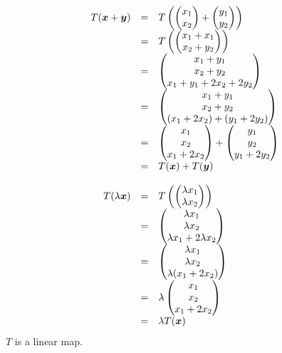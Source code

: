 \documentclass[11pt,a4paper]{article}
\begin{document}
\[\begin{array}{rcl}
  T(\boldsymbol{x} + \boldsymbol{y}) &=& T\left(\begin{pmatrix} x_1 \\ x_2 \end{pmatrix} + \begin{pmatrix} y_1 \\ y_2 \end{pmatrix} \right)\\
  &=& T\left( \begin{pmatrix} x_1 + x_1 \\ x_2 + y_2 \end{pmatrix} \right)\\
  &=& \begin{pmatrix} x_1 + y_1 \\ x_2 + y_2 \\ x_1 + y_1 + 2x_2 + 2y_2 \end{pmatrix}\\
  &=& \begin{pmatrix} x_1 + y_1 \\ x_2 + y_2 \\ (x_1 + 2x_2) + (y_1 + 2y_2) \end{pmatrix}\\
  &=& \begin{pmatrix} x_1 \\ x_2 \\ x_1 + 2x_2 \end{pmatrix} + \begin{pmatrix} y_1 \\ y_2 \\ y_1 + 2y_2 \end{pmatrix}\\
  &=& T(\boldsymbol{x}) + T(\boldsymbol{y})\\\\
  T(\lambda\boldsymbol{x}) &=& T\left( \begin{pmatrix} \lambda x_1 \\ \lambda x_2 \end{pmatrix}\right)\\
  &=& \begin{pmatrix} \lambda x_1 \\ \lambda x_2 \\ \lambda x_1 + 2\lambda x_2 \end{pmatrix}\\
  &=& \begin{pmatrix} \lambda x_1 \\ \lambda x_2 \\ \lambda (x_1 + 2x_2) \end{pmatrix}\\
  &=& \lambda\begin{pmatrix} x_1 \\ x_2 \\ x_1 + 2x_2 \end{pmatrix}\\
  &=& \lambda T(\boldsymbol{x})
\end{array}\]
$T$ is a linear map.\\
\end{document}
